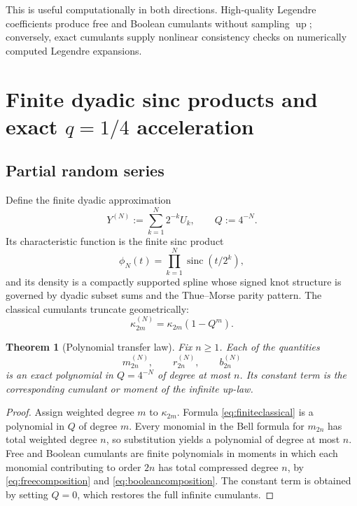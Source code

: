 \documentclass[11pt]{article}
\newtheorem{theorem}{Theorem}[section]
\theoremstyle{definition}
\newcommand{\Up}{\operatorname{up}}
\newcommand{\sinc}{\operatorname{sinc}}
\begin{document}
This is useful computationally in both directions. High-quality Legendre coefficients produce free and Boolean cumulants without sampling \(\Up\); conversely, exact cumulants supply nonlinear consistency checks on numerically computed Legendre expansions.

\section{Finite dyadic sinc products and exact \texorpdfstring{\(q=1/4\)}{q=1/4} acceleration}
\subsection{Partial random series}
Define the finite dyadic approximation
\begin{equation}\label{eq:finiteY}
Y^{(N)}:=\sum_{k=1}^N2^{-k}U_k,
\qquad Q:=4^{-N}.
\end{equation}
Its characteristic function is the finite sinc product
\[
\phi_N(t)=\prod_{k=1}^N\sinc(t/2^k),
\]
and its density is a compactly supported spline whose signed knot structure is governed by dyadic subset sums and the Thue--Morse parity pattern. The classical cumulants truncate geometrically:
\begin{equation}\label{eq:finiteclassical}
\kappa_{2m}^{(N)}=\kappa_{2m}(1-Q^m).
\end{equation}

\begin{theorem}[Polynomial transfer law]\label{thm:finitepolynomial}
Fix \(n\ge1\). Each of the quantities
\[
m_{2n}^{(N)},\qquad r_{2n}^{(N)},\qquad b_{2n}^{(N)}
\]
is an exact polynomial in \(Q=4^{-N}\) of degree at most \(n\). Its constant term is the corresponding cumulant or moment of the infinite up-law.
\end{theorem}
\begin{proof}
Assign weighted degree \(m\) to \(\kappa_{2m}\). Formula \eqref{eq:finiteclassical} is a polynomial in \(Q\) of degree \(m\). Every monomial in the Bell formula for \(m_{2n}\) has total weighted degree \(n\), so substitution yields a polynomial of degree at most \(n\). Free and Boolean cumulants are finite polynomials in moments in which each monomial contributing to order \(2n\) has total compressed degree \(n\), by \eqref{eq:freecomposition} and \eqref{eq:booleancomposition}. The constant term is obtained by setting \(Q=0\), which restores the full infinite cumulants.
\end{proof}
\end{document}
